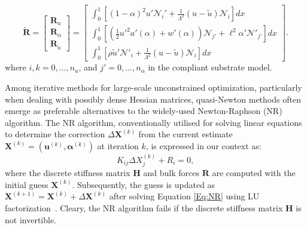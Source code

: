 \documentclass[10pt]{article}
\begin{document}
    {
        \begin{equation}
            \widetilde{\mathbf{R}} =
            \begin{bmatrix}
                \mathbf{R}_u      \\
                \mathbf{R}_\alpha \\
                \mathbf{R}_{\tilde u}
            \end{bmatrix}
            =
            \begin{bmatrix}
                \int_0^1 \left[
                    (1 - \alpha)^2 u' \mathcal{N}_i' + \frac{1}{\Lambda^2} (u - \tilde{u}) \mathcal{N}_i
                \right] dx \\
                \int_0^1 \left[
                (\frac{1}{2} u'^2 a'(\alpha) + w'(\alpha)) \mathcal{N}_{j'} + \ell^2 \alpha' \mathcal{N}'_{j'}
                \right] dx \\
                \int_0^1 \left[
                    \rho \tilde u' \mathcal{N}'_i + \frac{1}{\Lambda^2} (u - \tilde{u}) \mathcal{N}_i
                    \right] dx
            \end{bmatrix}.
            \label{residual2}
        \end{equation}
    }
where $i, k= 0, \dots, n_u$, and $j' = 0,\dots, n_\alpha$
in the compliant substrate model.

Among iterative methods for large-scale unconstrained optimization, particularly when dealing with possibly dense Hessian matrices,  quasi-Newton methods often emerge as preferable alternatives to the widely-used Newton-Raphson (NR) algorithm. The NR algorithm, conventionally utilised for solving linear equations to determine the correction $\Delta \mathbf{X}^{(k)}$ from the current estimate $\mathbf{X}^{(k)} = (\mathbf{u}^{(k)}, \boldsymbol{\alpha}^{(k)})$ at iteration $k$, is expressed in our context as:
\begin{equation}
    K_{ij} \Delta X_j^{(k)} + R_i = 0,
    \label{Eq:NR}
\end{equation}
where the discrete stiffness matrix $\mathbf{H}$ and bulk forces $\mathbf{R}$ are computed with the initial guess $\mathbf{X}^{(k)}$. Subsequently, the guess is updated as $\mathbf{X}^{(k+1)} = \mathbf{X}^{(k)} + \Delta \mathbf{X}^{(k)}$ after solving Equation \eqref{Eq:NR} using LU factorization~\cite{Sanderson2016-ht}. Cleary, the NR algorithm fails if the discrete stiffness matrix $\mathbf{H}$ is not invertible.
\end{document}
